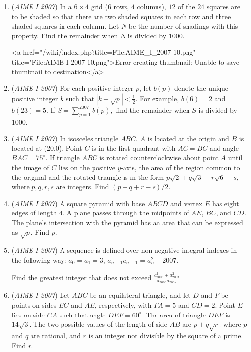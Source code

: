 \begin{enumerate}
 

	\item (\textit{AIME I 2007}) In a $6 \times 4$ grid ($6$ rows, $4$ columns), $12$ of the $24$ squares are to be shaded so that there are two shaded squares in each row and three shaded squares in each column.  Let $N$ be the number of shadings with this property.  Find the remainder when $N$ is divided by $1000$.


 <a href="/wiki/index.php?title=File:AIME\_I\_2007-10.png" title="File:AIME I 2007-10.png">Error creating thumbnail: Unable to save thumbnail to destination</a>


	\item (\textit{AIME I 2007}) For each positive integer $p$, let $b(p)$ denote the unique positive integer $k$ such that $|k-\sqrt{p}| < \frac{1}{2}$.  For example, $b(6) = 2$ and $b(23) = 5$.  If $S = \sum_{p=1}^{2007} b(p),$ find the remainder when $S$ is divided by 1000.


 

	\item (\textit{AIME I 2007}) In isosceles triangle $ABC$, $A$ is located at the origin and $B$ is located at (20,0).  Point $C$ is in the first quadrant with $AC = BC$ and angle $BAC = 75^{\circ}$.  If triangle $ABC$ is rotated counterclockwise about point $A$ until the image of $C$ lies on the positive $y$-axis, the area of the region common to the original and the rotated triangle is in the form $p\sqrt{2} + q\sqrt{3} + r\sqrt{6} + s$, where $p,q,r,s$ are integers.  Find $(p-q+r-s)/2$.


 

	\item (\textit{AIME I 2007}) A square pyramid with base $ABCD$ and vertex $E$ has eight edges of length 4.  A plane passes through the midpoints of $AE$, $BC$, and $CD$.  The plane's intersection with the pyramid has an area that can be expressed as $\sqrt{p}$.  Find $p$.


 

	\item (\textit{AIME I 2007}) A sequence is defined over non-negative integral indexes in the following way: $a_{0}=a_{1}=3$, $a_{n+1}a_{n-1}=a_{n}^{2}+2007$.


 Find the greatest integer that does not exceed $\frac{a_{2006}^{2}+a_{2007}^{2}}{a_{2006}a_{2007}}$


	\item (\textit{AIME I 2007}) Let $ABC$ be an equilateral triangle, and let $D$ and $F$ be points on sides $BC$ and $AB$, respectively, with $FA = 5$ and $CD = 2$.  Point $E$ lies on side $CA$ such that angle $DEF = 60^{\circ}$.  The area of triangle $DEF$ is $14\sqrt{3}$.  The two possible values of the length of side $AB$ are $p \pm q \sqrt{r}$, where $p$ and $q$ are rational, and $r$ is an integer not divisible by the square of a prime.  Find $r$.


 

\end{enumerate}